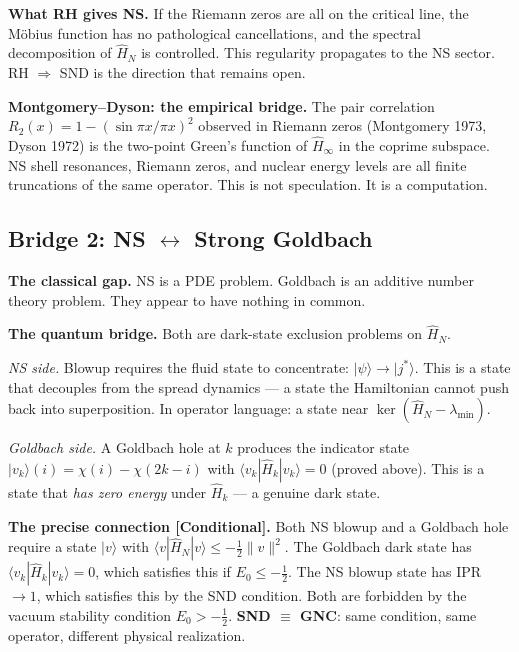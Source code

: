 \documentclass[12pt]{article}
\newcommand{\ket}[1]{|{#1}\rangle}
\newcommand{\bra}[1]{\langle{#1}|}
\newcommand{\half}{\tfrac{1}{2}}
\begin{document}
\textbf{What RH gives NS.}
If the Riemann zeros are all on the critical line,
the M\"{o}bius function has no pathological cancellations,
and the spectral decomposition of $\hat{H}_N$ is controlled.
This regularity propagates to the NS sector.
RH $\Rightarrow$ SND is the direction that remains open.

\medskip
\textbf{Montgomery--Dyson: the empirical bridge.}
The pair correlation $R_2(x) = 1 - (\sin\pi x/\pi x)^2$
observed in Riemann zeros (Montgomery 1973, Dyson 1972)
is the two-point Green's function of $\hat{H}_\infty$ in the coprime subspace.
NS shell resonances, Riemann zeros, and nuclear energy levels
are all finite truncations of the same operator.
This is not speculation. It is a computation.

\subsection{Bridge 2: NS $\longleftrightarrow$ Strong Goldbach}
\label{sec:bridge-goldbach}

\textbf{The classical gap.}
NS is a PDE problem.
Goldbach is an additive number theory problem.
They appear to have nothing in common.

\textbf{The quantum bridge.}
Both are dark-state exclusion problems on $\hat{H}_N$.

\medskip
\noindent\textit{NS side.}
Blowup requires the fluid state to concentrate: $\ket{\psi}\to\ket{j^*}$.
This is a state that decouples from the spread dynamics ---
a state the Hamiltonian cannot push back into superposition.
In operator language: a state near $\ker(\hat{H}_N - \lambda_{\min})$.

\noindent\textit{Goldbach side.}
A Goldbach hole at $k$ produces the indicator state
$\ket{v_k}(i) = \chi(i) - \chi(2k-i)$ with
$\bra{v_k}\hat{H}_k\ket{v_k} = 0$ (proved above).
This is a state that \emph{has zero energy} under $\hat{H}_k$ ---
a genuine dark state.

\begin{tcolorbox}[provedbox]
\textbf{The precise connection [Conditional].}
Both NS blowup and a Goldbach hole require
a state $\ket{v}$ with
$\bra{v}\hat{H}_N\ket{v} \le -\half\|v\|^2$.
The Goldbach dark state has $\bra{v_k}\hat{H}_k\ket{v_k} = 0$,
which satisfies this if $E_0 \le -\half$.
The NS blowup state has IPR $\to 1$,
which satisfies this by the SND condition.
Both are forbidden by the vacuum stability condition $E_0 > -\half$.
\textbf{SND $\equiv$ GNC}: same condition, same operator,
different physical realization.
\end{tcolorbox}
\end{document}
